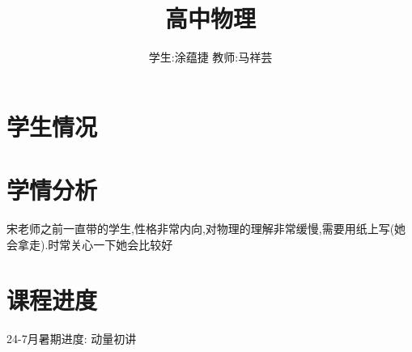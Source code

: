 \documentclass{article}
\title{高中物理}
\author{学生:\quad 涂蕴捷 \quad 教师:\quad 马祥芸}
\begin{document}
\maketitle
\tableofcontents
\newpage
{}

\section{学生情况}
\begin{center}
\end{center}

\section{学情分析}
宋老师之前一直带的学生,性格非常内向,对物理的理解非常缓慢,需要用纸上写(她会拿走).时常关心一下她会比较好

\vspace{2em}

\section{课程进度}
24-7月暑期进度: 动量初讲
\end{document}

